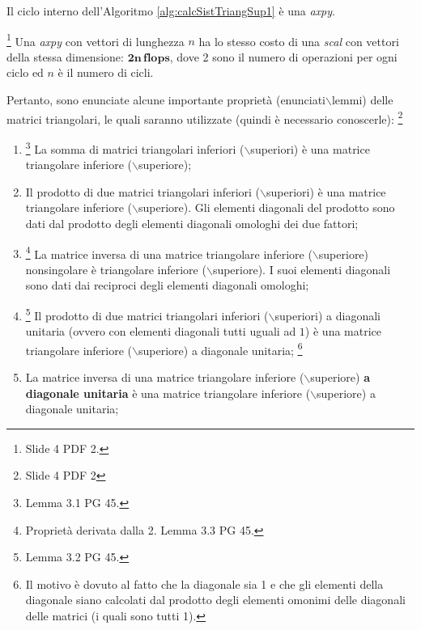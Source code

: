 Il ciclo interno dell'Algoritmo \ref{alg:calcSistTriangSup1} è una \textit{axpy}.

\begin{remark}\footnote{Slide 4 PDF 2.}
    Una \textit{axpy} con vettori di lunghezza $n$ ha lo stesso costo di una \textit{scal} con vettori della stessa dimensione: $\boldsymbol{2n\, flops}$, dove 2 sono il numero di operazioni per ogni ciclo ed $n$ è il numero di cicli.
\end{remark}

Pertanto, sono enunciate alcune importante proprietà (enunciati$\backslash$lemmi) delle matrici triangolari, le quali saranno utilizzate (quindi è necessario conoscerle): \footnote{Slide 4 PDF 2}
\begin{enumerate}
    \item \footnote{Lemma 3.1 PG 45.} La somma di matrici triangolari inferiori ($\backslash$superiori) è una matrice triangolare inferiore ($\backslash$superiore);
    \item Il prodotto di due matrici triangolari inferiori ($\backslash$superiori) è una matrice triangolare inferiore ($\backslash$superiore). Gli elementi diagonali del prodotto sono dati dal prodotto degli elementi diagonali omologhi dei due fattori;
    \item \footnote{Proprietà derivata dalla 2. Lemma 3.3 PG 45.} La matrice inversa di una matrice triangolare inferiore ($\backslash$superiore) \gls{nonsingolare} è triangolare inferiore ($\backslash$superiore). I suoi elementi diagonali sono dati dai reciproci degli elementi diagonali omologhi;
    \item  \footnote{Lemma 3.2 PG 45.} Il prodotto di due matrici triangolari inferiori ($\backslash$superiori) a diagonali unitaria (ovvero con elementi diagonali tutti uguali ad $1$) è una matrice triangolare inferiore ($\backslash$superiore) a diagonale unitaria; \footnote{Il motivo è dovuto al fatto che la diagonale sia 1 e che gli elementi della diagonale siano calcolati dal prodotto degli elementi omonimi delle diagonali delle matrici (i quali sono tutti 1).}
    \item La matrice inversa di una matrice triangolare inferiore ($\backslash$superiore) \textbf{a diagonale unitaria} è una matrice triangolare inferiore ($\backslash$superiore) a diagonale unitaria;
\end{enumerate}

